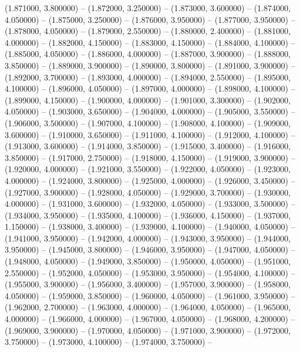(1.871000, 3.800000) -- 
(1.872000, 3.250000) -- 
(1.873000, 3.600000) -- 
(1.874000, 4.050000) -- 
(1.875000, 3.250000) -- 
(1.876000, 3.950000) -- 
(1.877000, 3.950000) -- 
(1.878000, 4.050000) -- 
(1.879000, 2.550000) -- 
(1.880000, 2.400000) -- 
(1.881000, 4.000000) -- 
(1.882000, 4.150000) -- 
(1.883000, 4.150000) -- 
(1.884000, 4.100000) -- 
(1.885000, 4.050000) -- 
(1.886000, 4.000000) -- 
(1.887000, 3.900000) -- 
(1.888000, 3.850000) -- 
(1.889000, 3.900000) -- 
(1.890000, 3.800000) -- 
(1.891000, 3.900000) -- 
(1.892000, 3.700000) -- 
(1.893000, 4.000000) -- 
(1.894000, 2.550000) -- 
(1.895000, 4.100000) -- 
(1.896000, 4.050000) -- 
(1.897000, 4.000000) -- 
(1.898000, 4.100000) -- 
(1.899000, 4.150000) -- 
(1.900000, 4.000000) -- 
(1.901000, 3.300000) -- 
(1.902000, 4.050000) -- 
(1.903000, 3.650000) -- 
(1.904000, 4.000000) -- 
(1.905000, 3.550000) -- 
(1.906000, 3.500000) -- 
(1.907000, 4.100000) -- 
(1.908000, 4.100000) -- 
(1.909000, 3.600000) -- 
(1.910000, 3.650000) -- 
(1.911000, 4.100000) -- 
(1.912000, 4.100000) -- 
(1.913000, 3.600000) -- 
(1.914000, 3.850000) -- 
(1.915000, 3.400000) -- 
(1.916000, 3.850000) -- 
(1.917000, 2.750000) -- 
(1.918000, 4.150000) -- 
(1.919000, 3.900000) -- 
(1.920000, 4.000000) -- 
(1.921000, 3.550000) -- 
(1.922000, 4.050000) -- 
(1.923000, 4.000000) -- 
(1.924000, 3.800000) -- 
(1.925000, 4.000000) -- 
(1.926000, 3.450000) -- 
(1.927000, 3.900000) -- 
(1.928000, 4.050000) -- 
(1.929000, 3.700000) -- 
(1.930000, 4.000000) -- 
(1.931000, 3.600000) -- 
(1.932000, 4.050000) -- 
(1.933000, 3.500000) -- 
(1.934000, 3.950000) -- 
(1.935000, 4.100000) -- 
(1.936000, 4.150000) -- 
(1.937000, 1.150000) -- 
(1.938000, 3.400000) -- 
(1.939000, 4.100000) -- 
(1.940000, 4.050000) -- 
(1.941000, 3.950000) -- 
(1.942000, 4.000000) -- 
(1.943000, 3.950000) -- 
(1.944000, 3.950000) -- 
(1.945000, 3.800000) -- 
(1.946000, 3.950000) -- 
(1.947000, 4.050000) -- 
(1.948000, 4.050000) -- 
(1.949000, 3.850000) -- 
(1.950000, 4.050000) -- 
(1.951000, 2.550000) -- 
(1.952000, 4.050000) -- 
(1.953000, 3.950000) -- 
(1.954000, 4.100000) -- 
(1.955000, 3.900000) -- 
(1.956000, 3.400000) -- 
(1.957000, 3.900000) -- 
(1.958000, 4.050000) -- 
(1.959000, 3.850000) -- 
(1.960000, 4.050000) -- 
(1.961000, 3.950000) -- 
(1.962000, 2.700000) -- 
(1.963000, 4.000000) -- 
(1.964000, 4.050000) -- 
(1.965000, 4.000000) -- 
(1.966000, 4.000000) -- 
(1.967000, 4.050000) -- 
(1.968000, 4.200000) -- 
(1.969000, 3.900000) -- 
(1.970000, 4.050000) -- 
(1.971000, 3.900000) -- 
(1.972000, 3.750000) -- 
(1.973000, 4.100000) -- 
(1.974000, 3.750000) -- 
